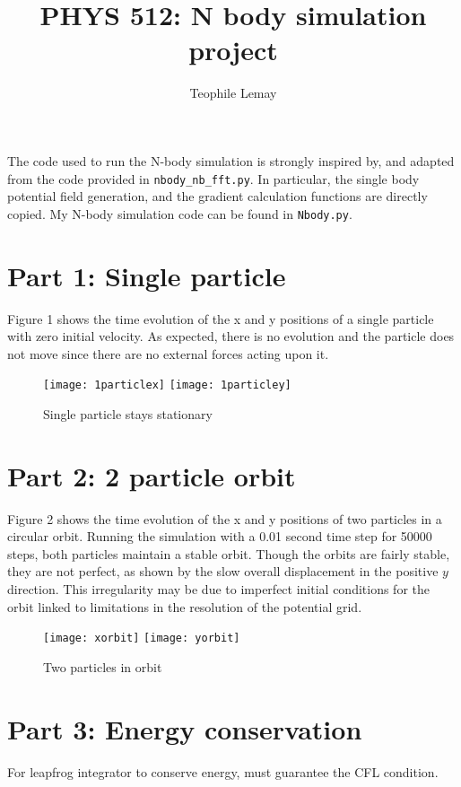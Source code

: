 \documentclass{article}
\title{PHYS 512: N body simulation project}
\author{Teophile Lemay}
\date{}
\newcommand{\<}[1]{\left\langle #1 \right\rangle }
\begin{document}
\maketitle

The code used to run the N-body simulation is strongly inspired by, and adapted from the code provided in \texttt{nbody\_nb\_fft.py}. In particular, the single body potential field generation, and the gradient calculation functions are directly copied. My N-body simulation code can be found in \texttt{Nbody.py}.

\section{Part 1: Single particle}
Figure 1 shows the time evolution of the x and y positions of a single particle with zero initial velocity. As expected, there is no evolution and the particle does not move since there are no external forces acting upon it.
\begin{figure}[h]
	\caption{Single particle stays stationary}
	\texttt{[image: 1particlex]}
	\texttt{[image: 1particley]}
\end{figure} 

\section{Part 2: 2 particle orbit}
Figure 2 shows the time evolution of the x and y positions of two particles in a circular orbit. Running the simulation with a 0.01 second time step for 50000 steps, both particles maintain a stable orbit. Though the orbits are fairly stable, they are not perfect, as shown by the slow overall displacement in the positive $y$ direction. This irregularity may be due to imperfect initial conditions for the orbit linked to limitations in the resolution of the potential grid.
\begin{figure}[h]
	\caption{Two particles in orbit}
	\texttt{[image: xorbit]}
	\texttt{[image: yorbit]}
\end{figure}
	
\section{Part 3: Energy conservation}
For leapfrog integrator to conserve energy, must guarantee the CFL condition.



	
\end{document}
